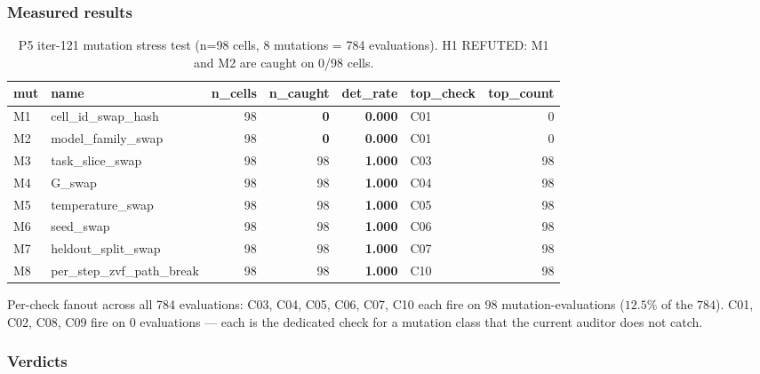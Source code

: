 \subsubsection{Measured results}

\begin{table}[ht]
\centering
\small
\begin{tabular}{l l r r r l r}
\toprule
mut & name & n\_cells & n\_caught & det\_rate & top\_check & top\_count \\
\midrule
M1 & cell\_id\_swap\_hash        & 98 &  \textbf{0} & \textbf{0.000} & C01 & 0  \\
M2 & model\_family\_swap         & 98 &  \textbf{0} & \textbf{0.000} & C01 & 0  \\
M3 & task\_slice\_swap           & 98 & 98 & \textbf{1.000} & C03 & 98 \\
M4 & G\_swap                     & 98 & 98 & \textbf{1.000} & C04 & 98 \\
M5 & temperature\_swap           & 98 & 98 & \textbf{1.000} & C05 & 98 \\
M6 & seed\_swap                  & 98 & 98 & \textbf{1.000} & C06 & 98 \\
M7 & heldout\_split\_swap        & 98 & 98 & \textbf{1.000} & C07 & 98 \\
M8 & per\_step\_zvf\_path\_break & 98 & 98 & \textbf{1.000} & C10 & 98 \\
\bottomrule
\end{tabular}
\caption{P5 iter-121 mutation stress test (n=98 cells, 8 mutations = 784
evaluations). H1 REFUTED: M1 and M2 are caught on 0/98 cells.}
\label{tab:p5-iter121-mutation}
\end{table}

Per-check fanout across all 784 evaluations: C03, C04, C05, C06, C07, C10
each fire on $98$ mutation-evaluations ($12.5\%$ of the $784$). C01, C02,
C08, C09 fire on $0$ evaluations --- each is the dedicated check for a
mutation class that the current auditor does not catch.

\subsubsection{Verdicts}

